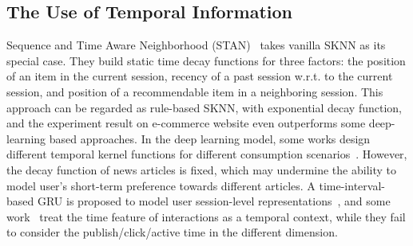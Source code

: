 \subsection{The Use of Temporal Information}
Sequence and Time Aware Neighborhood (STAN)~\cite{garg2019sequence} takes vanilla SKNN as its special case. They build static time decay functions for three factors: the position of an item in the current session, recency of a past session w.r.t. to the current session, and position of a recommendable item in a neighboring session. This approach can be regarded as rule-based SKNN, with exponential decay function, and the experiment result on e-commerce website even outperforms some deep-learning based approaches. In the deep learning model, some works design different temporal kernel functions for different consumption scenarios~\cite{wang2020make, wu2020deja}. However, the decay function of news articles is fixed, which may undermine the ability to model user's short-term preference towards different articles.
A time-interval-based GRU is proposed to model user session-level representations~\cite{lei_tissa_2019}, and some work~\cite{rakkappan2019context,xu2019time,wu_recommender_2019} treat the time feature of interactions as a temporal context, while they fail to consider the publish/click/active time in the different dimension.
